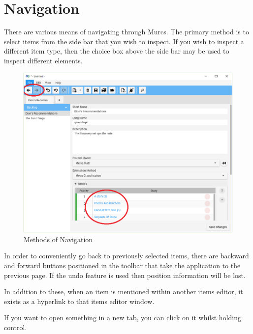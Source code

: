 \section{Navigation}

There are various means of navigating through Murcs. The primary method is to select items from the side bar that you wish to inspect. If you wish to inspect a different item type, then the choice box above the side bar may be used to inspect different elements.

\begin{figure}[H]
\centering
\includegraphics[width=\textwidth]{images/screenshots/navigation.PNG}
\caption{Methods of Navigation}
\label{fig:new_project}
\end{figure}

In order to conveniently go back to previously selected items, there are backward and forward buttons positioned in the toolbar that take the application to the previous page. If the undo feature is used then position information will be lost.

In addition to these, when an item is mentioned within another items editor, it exists as a hyperlink to that items editor window.

If you want to open something in a new tab, you can click on it whilst holding control.
